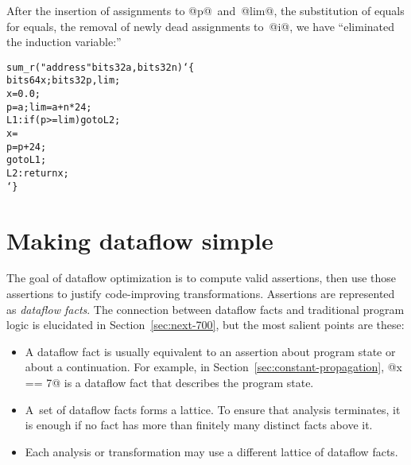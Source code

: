 \documentclass[blockstyle,preprint,natbib,nocopyrightspace]{sigplanconf}
\newcommand\lbr{\char`\{}
\newcommand\rbr{\char`\}}
\newcommand\secref[1]{Section~\ref{sec:#1}}
\newcommand\seclabel[1]{\label{sec:#1}}
\begin{document}
After the insertion of assignments to @p@~and~@lim@, the substitution
of equals for equals, the removal of newly dead assignments
to~@i@, we have ``eliminated the induction variable:''
\begin{alltt}
sum_r("address" bits32 a, bits32 n) \lbr
     bits64 x; bits32 p, lim;
     x = 0.0;
     p = a; lim = a + n * 24;
 L1: if ({p >= lim}) goto L2;
     x = %fadd(x, bits64[{p}]);
     p = p + 24;
     goto L1;
 L2: return x; 
\rbr
\end{alltt}

  
\section {Making dataflow simple}

\seclabel{making-simple}

\seclabel{create-analysis}

The goal of dataflow optimization is to compute valid
assertions, then use those assertions to justify code-improving
transformations.
%
%
Assertions are represented as
\emph{dataflow facts}.
The connection between dataflow facts and
 traditional 
program logic is
elucidated in \secref{next-700}, but the most salient points are
these:
\begin{itemize}
\item
A dataflow fact is usually equivalent to an assertion about program state or
about a continuation.
For example, in \secref{constant-propagation}, @x == 7@ is a dataflow
fact that describes the program state. 


\item
A~set of dataflow facts forms a lattice.
To ensure that analysis terminates,
it is enough if
no fact has more than finitely many distinct facts above it.
\item
Each analysis or transformation may use a different lattice of
dataflow facts.
\end{itemize}
\end{document}
